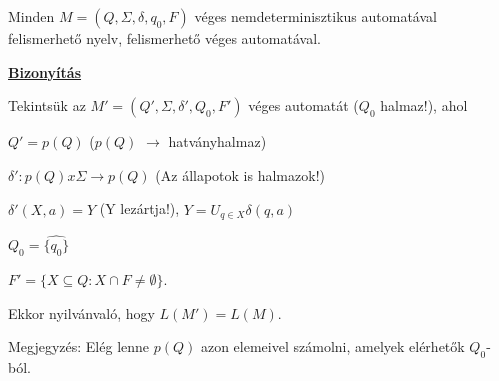 \documentclass[10pt]{article}
\renewcommand{\\}{\par\noindent}
\begin{document}
\begin{frame}
\begin{tcolorbox}[title={Tétel: Nemdeterminisztikus automata}]
Minden $M = (Q, \Sigma , \delta , q_0, F)$ véges nemdeterminisztikus automatával felismerhető nyelv, felismerhető véges automatával.\\
\tcblower
\smallskip
\underline{\textbf{Bizonyítás}}\\
\medskip
\\
Tekintsük az $M' = (Q', \Sigma , {\delta}', Q_0, F')$ véges automatát ($Q_0$ halmaz!), ahol\\
$Q' = p(Q)$ ($p(Q)$ $\rightarrow$ hatványhalmaz)\\
${\delta}' : p(Q) x \Sigma \rightarrow p(Q)$ (Az állapotok is halmazok!)\\
${\delta}'(X, a) = \widehat{Y}$ (Y lezártja!), $Y = U_{q \in X} \delta(q, a)$\\
$Q_0 = \widehat{\{q_0\}}$\\
$F' = \{X \subseteq Q : X \cap F \neq \emptyset \}$.\\
Ekkor nyilvánvaló, hogy $L(M') = L(M)$.\\
Megjegyzés: Elég lenne $p(Q)$ azon elemeivel számolni, amelyek elérhetők $Q_0$-ból.

\end{tcolorbox}

\end{frame}
\end{document}
